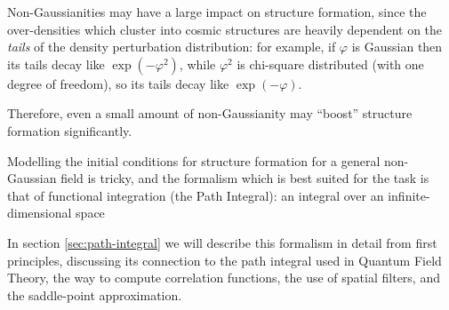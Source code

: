 \documentclass[main.tex]{subfiles}
\begin{document}
Non-Gaussianities may have a large impact on structure formation, since the over-densities which cluster into cosmic structures are heavily dependent on the \emph{tails} of the density perturbation distribution: for example, if \(\varphi \) is Gaussian then its tails decay like \(\exp(- \varphi^2)\), while \(\varphi^2\) is chi-square distributed (with one degree of freedom), so its tails decay like \(\exp(- \varphi )\).

Therefore, even a small amount of non-Gaussianity may ``boost'' structure formation significantly.


Modelling the initial conditions for structure formation for a general non-Gaussian field is tricky, and the formalism which is best suited for the task is that of functional integration (the Path Integral): an integral over an infinite-dimensional space




In section \ref{sec:path-integral} we will describe this formalism in detail from first principles, discussing its connection to the path integral used in Quantum Field Theory, the way to compute correlation functions, the use of spatial filters, and the saddle-point approximation. 

\end{document}
